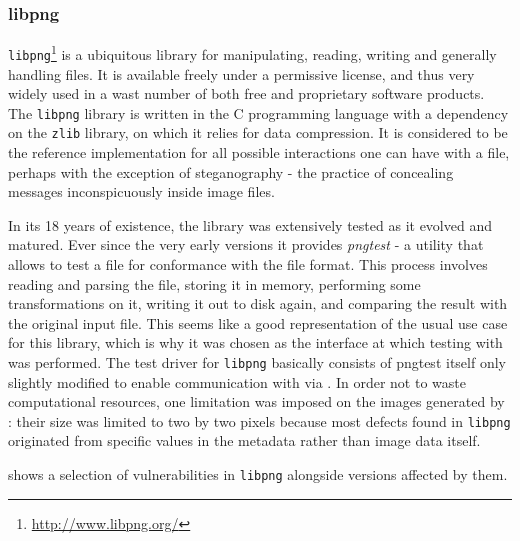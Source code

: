 \subsubsection{libpng}
\texttt{libpng}\footnote{\url{http://www.libpng.org/}} is a ubiquitous library for manipulating, reading,
writing and generally handling \png files. It is available freely under a permissive license, and thus very
widely used in a wast number of both free and proprietary software products. The \texttt{libpng} library is
written in the {\small C} programming language with a dependency on the \texttt{zlib} library, on which it
relies for data compression. It is considered to be the reference implementation for all possible interactions
one can have with a \png file, perhaps with the exception of steganography - the practice of concealing
messages inconspicuously inside image files.

In its 18 years of existence, the library was extensively tested as it evolved and matured. Ever since the very
early versions it provides \emph{pngtest} - a utility that allows to test a \png file for conformance with the
\png file format. This process involves reading and parsing the file, storing it in memory, performing some
transformations on it, writing it out to disk again, and comparing the result with the original input file.
This seems like a good representation of the usual use case for this library, which is why it was chosen as
the interface at which testing with \xmlmate was performed. The test driver for \texttt{libpng} basically
consists of pngtest itself only slightly modified to enable communication with \xmlmate via \zmq. In order not
to waste computational resources, one limitation was imposed on the images generated by \xmlmate: their size
was limited to two by two pixels because most defects found in \texttt{libpng} originated from specific values
in the metadata rather than image data itself.

 shows a selection of vulnerabilities in \texttt{libpng} alongside versions affected by
them.

